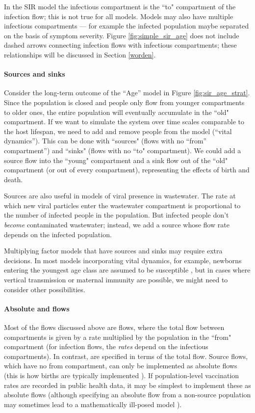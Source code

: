 In the SIR model the infectious compartment is the ``to" compartment of the infection flow; this is not true for all models.  Models may also have multiple infectious compartments --- for example the infected population maybe separated on the basis of symptom severity. Figure \ref{fig:simple_sir_age} does not include dashed arrows connecting infection flows with infectious compartments; these relationships will be discussed in Section \ref{worden}.

\paragraph{Sources and sinks}

Consider the long-term outcome of the ``Age'' model in Figure \ref{fig:sir_age_strat}. Since the population is closed and people only flow from younger compartments to older ones, the entire population will eventually accumulate in the ``old" compartment. If we want to simulate the system over time scales comparable to the host lifespan, we need to add and remove people from the model (``vital dynamics''). This can be done with ``sources" (flows with no ``from'' compartment'') and ``sinks" (flows with no ``to" compartment). We could add a source flow into the ``young" compartment and a sink flow out of the ``old" compartment (or out of every compartment), representing the effects of birth and death. 

Sources are also useful in models of viral presence in wastewater. The rate at which new viral particles enter the wastewater compartment is proportional to the number of infected people in the population. But infected people don't \emph{become} contaminated wastewater; instead, we add a source whose flow rate depends on the infected population.

Multiplying factor models that have sources and sinks may require extra decisions. In most models incorporating vital dynamics, for example, newborns entering the youngest age class are assumed to be susceptible \citep{Earn2008}, but in cases where vertical transmission or maternal immunity are possible, we might need to consider other possibilities. 

\paragraph{Absolute and \pc flows}

Most of the flows discussed above are \pc flows, where the total flow between compartments is given by a \pc rate multiplied by the population in the ``from" compartment
(for infection flows, the \pc \emph{rates} depend on the infectious compartments).
In contrast,  are specified in terms of the total flow. 
Source flows, which have no from compartment, can only be implemented as absolute flows (this is how births are typically implemented \citep{Earn2008}). If population-level vaccination rates are recorded in public health data, it may be simplest to implement these as absolute flows (although specifying an absolute flow from a non-source population may sometimes lead to a mathematically ill-posed model \citep{gharouni2022testing}).

